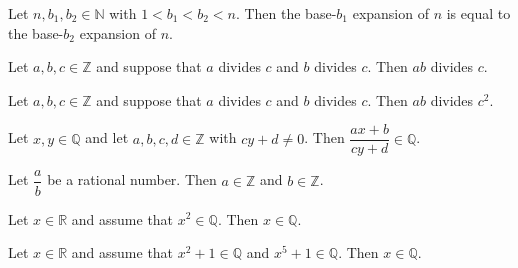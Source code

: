 \begin{chapex} %
Let $n,b_1,b_2 \in \mathbb{N}$ with $1 < b_1 < b_2 < n$. Then the base-$b_1$ expansion of $n$ is equal to the base-$b_2$ expansion of $n$.
\end{chapex}

\begin{chapex} %
Let $a,b,c \in \mathbb{Z}$ and suppose that $a$ divides $c$ and $b$ divides $c$. Then $ab$ divides $c$.
\end{chapex}

\begin{chapex} %
Let $a,b,c \in \mathbb{Z}$ and suppose that $a$ divides $c$ and $b$ divides $c$. Then $ab$ divides $c^2$.
\end{chapex}

\begin{chapex} %
Let $x,y \in \mathbb{Q}$ and let $a,b,c,d \in \mathbb{Z}$ with $cy+d \ne 0$. Then $\dfrac{ax+b}{cy+d} \in \mathbb{Q}$.
\end{chapex}

\begin{chapex} %
Let $\dfrac{a}{b}$ be a rational number. Then $a \in \mathbb{Z}$ and $b \in \mathbb{Z}$.
\end{chapex}

\begin{chapex} %
Let $x \in \mathbb{R}$ and assume that $x^2 \in \mathbb{Q}$. Then $x \in \mathbb{Q}$.
\end{chapex}

\begin{chapex} %
\label{cqGettingStartedASNEnd}
Let $x \in \mathbb{R}$ and assume that $x^2+1 \in \mathbb{Q}$ and $x^5+1 \in \mathbb{Q}$. Then $x \in \mathbb{Q}$.
\end{chapex}

